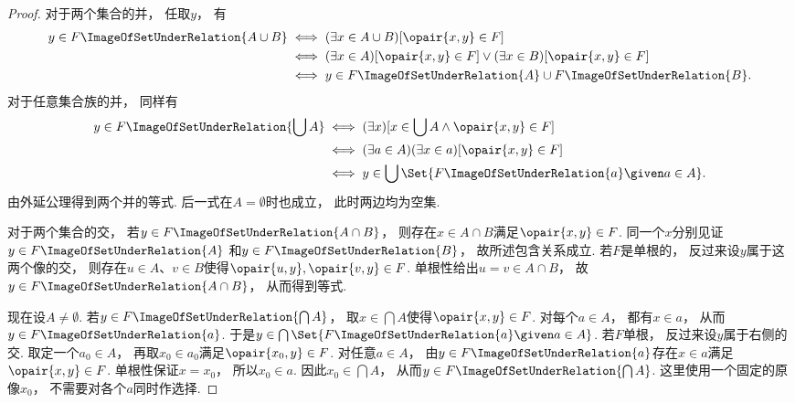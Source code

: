 \begin{theorem}
\begin{proof}
        对于两个集合的并，
        任取\(y\)，
        有
        \begin{align*}
            y\in F\ImageOfSetUnderRelation{A\cup B}
            &\iff(\exists x\in A\cup B)[\opair{x,y}\in F] \\
            &\iff(\exists x\in A)[\opair{x,y}\in F]
            \lor(\exists x\in B)[\opair{x,y}\in F] \\
            &\iff y\in F\ImageOfSetUnderRelation{A}\cup F\ImageOfSetUnderRelation{B}.
        \end{align*}
        对于任意集合族的并，
        同样有
        \begin{align*}
            y\in F\ImageOfSetUnderRelation{\bigcup A}
            &\iff(\exists x)[x\in\bigcup A\land\opair{x,y}\in F] \\
            &\iff(\exists a\in A)(\exists x\in a)[\opair{x,y}\in F] \\
            &\iff y\in\bigcup\Set{F\ImageOfSetUnderRelation{a}\given a\in A}.
        \end{align*}
        由外延公理得到两个并的等式.
        后一式在\(A=\emptyset\)时也成立，
        此时两边均为空集.

        对于两个集合的交，
        若\(y\in F\ImageOfSetUnderRelation{A\cap B}\)，
        则存在\(x\in A\cap B\)满足\(\opair{x,y}\in F\).
        同一个\(x\)分别见证\(y\in F\ImageOfSetUnderRelation{A}\)
        和\(y\in F\ImageOfSetUnderRelation{B}\)，
        故所述包含关系成立.
        若\(F\)是单根的，
        反过来设\(y\)属于这两个像的交，
        则存在\(u\in A\)、\(v\in B\)使得\(\opair{u,y},\opair{v,y}\in F\).
        单根性给出\(u=v\in A\cap B\)，
        故\(y\in F\ImageOfSetUnderRelation{A\cap B}\)，
        从而得到等式.

        现在设\(A\neq\emptyset\).
        若\(y\in F\ImageOfSetUnderRelation{\bigcap A}\)，
        取\(x\in\bigcap A\)使得\(\opair{x,y}\in F\).
        对每个\(a\in A\)，
        都有\(x\in a\)，
        从而\(y\in F\ImageOfSetUnderRelation{a}\).
        于是\(y\in\bigcap\Set{F\ImageOfSetUnderRelation{a}\given a\in A}\).
        若\(F\)单根，
        反过来设\(y\)属于右侧的交.
        取定一个\(a_0\in A\)，
        再取\(x_0\in a_0\)满足\(\opair{x_0,y}\in F\).
        对任意\(a\in A\)，
        由\(y\in F\ImageOfSetUnderRelation{a}\)存在\(x\in a\)满足\(\opair{x,y}\in F\).
        单根性保证\(x=x_0\)，
        所以\(x_0\in a\).
        因此\(x_0\in\bigcap A\)，
        从而\(y\in F\ImageOfSetUnderRelation{\bigcap A}\).
        这里使用一个固定的原像\(x_0\)，
        不需要对各个\(a\)同时作选择.


\end{proof}
\end{theorem}
